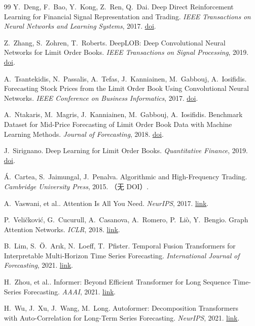 \begin{thebibliography}{99}
 Y.~Deng, F.~Bao, Y.~Kong, Z.~Ren, Q.~Dai. Deep Direct Reinforcement Learning for Financial Signal Representation and Trading. \emph{IEEE Transactions on Neural Networks and Learning Systems}, 2017. \href{https://doi.org/10.1109/tnnls.2016.2522401}{doi}.

 Z.~Zhang, S.~Zohren, T.~Roberts. DeepLOB: Deep Convolutional Neural Networks for Limit Order Books. \emph{IEEE Transactions on Signal Processing}, 2019. \href{https://doi.org/10.1109/tsp.2019.2907260}{doi}.

 A.~Tsantekidis, N.~Passalis, A.~Tefas, J.~Kanniainen, M.~Gabbouj, A.~Iosifidis. Forecasting Stock Prices from the Limit Order Book Using Convolutional Neural Networks. \emph{IEEE Conference on Business Informatics}, 2017. \href{https://doi.org/10.1109/cbi.2017.23}{doi}.

 A.~Ntakaris, M.~Magris, J.~Kanniainen, M.~Gabbouj, A.~Iosifidis. Benchmark Dataset for Mid-Price Forecasting of Limit Order Book Data with Machine Learning Methods. \emph{Journal of Forecasting}, 2018. \href{https://doi.org/10.1002/for.2543}{doi}.

 J.~Sirignano. Deep Learning for Limit Order Books. \emph{Quantitative Finance}, 2019. \href{https://doi.org/10.1080/14697688.2018.1546053}{doi}.

 Á.~Cartea, S.~Jaimungal, J.~Penalva. Algorithmic and High-Frequency Trading. \emph{Cambridge University Press}, 2015. （无 DOI）.

 A.~Vaswani, et al.. Attention Is All You Need. \emph{NeurIPS}, 2017. \href{https://arxiv.org/abs/1706.03762}{link}.

 P.~Veli\v{c}kovi\'c, G.~Cucurull, A.~Casanova, A.~Romero, P.~Liò, Y.~Bengio. Graph Attention Networks. \emph{ICLR}, 2018. \href{https://arxiv.org/abs/1710.10903}{link}.

 B.~Lim, S.~Ö.~Arık, N.~Loeff, T.~Pfister. Temporal Fusion Transformers for Interpretable Multi-Horizon Time Series Forecasting. \emph{International Journal of Forecasting}, 2021. \href{https://arxiv.org/abs/1912.09363}{link}.

 H.~Zhou, et al.. Informer: Beyond Efficient Transformer for Long Sequence Time-Series Forecasting. \emph{AAAI}, 2021. \href{https://arxiv.org/abs/2012.07436}{link}.

 H.~Wu, J.~Xu, J.~Wang, M.~Long. Autoformer: Decomposition Transformers with Auto-Correlation for Long-Term Series Forecasting. \emph{NeurIPS}, 2021. \href{https://arxiv.org/abs/2106.13008}{link}.


\end{thebibliography}
